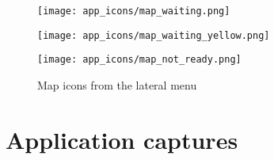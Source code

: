 \begin{appendices}
\begin{figure*}[h!t]
	\begin{multicols}{4}
		\hspace{\linewidth} 
	    \texttt{[image: app\_icons/map\_waiting.png]}\par 
	    \texttt{[image: app\_icons/map\_waiting\_yellow.png]}\par 
	    \hspace{\linewidth}
    \end{multicols}

    \texttt{[image: app\_icons/map\_not\_ready.png]}

	\caption{Map icons from the lateral menu}
\end{figure*}

\chapter{Application captures}
\label{ch:appendix_b}

\end{appendices}